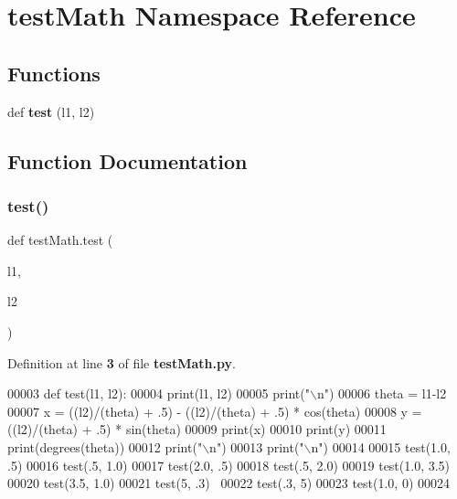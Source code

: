 \section{test\+Math Namespace Reference}
\label{namespacetest_math}
\subsection*{Functions}
\begin{DoxyCompactItemize}
\item 
def \textbf{ test} (l1, l2)
\end{DoxyCompactItemize}


\subsection{Function Documentation}
\mbox{\label{namespacetest_math_accae4d78fc0739220d35c06c2c0d5822}} 
\subsubsection{test()}
{\footnotesize\ttfamily def test\+Math.\+test (\begin{DoxyParamCaption}\item[{}]{l1,  }\item[{}]{l2 }\end{DoxyParamCaption})}



Definition at line \textbf{ 3} of file \textbf{ test\+Math.\+py}.


\begin{DoxyCode}
00003 \textcolor{keyword}{def }test(l1, l2):
00004     print(l1, l2)
00005     print(\textcolor{stringliteral}{"\(\backslash\)n"})
00006     theta = l1-l2
00007     x = ((l2)/(theta) + .5) - ((l2)/(theta) + .5) * cos(theta)
00008     y = ((l2)/(theta) + .5) * sin(theta)
00009     print(x)
00010     print(y)
00011     print(degrees(theta))
00012     print(\textcolor{stringliteral}{"\(\backslash\)n"})
00013     print(\textcolor{stringliteral}{"\(\backslash\)n"})
00014 
00015 test(1.0, .5)
00016 test(.5, 1.0)
00017 test(2.0, .5)
00018 test(.5, 2.0)
00019 test(1.0, 3.5)
00020 test(3.5, 1.0)
00021 test(5, .3) 
00022 test(.3, 5)
00023 test(1.0, 0)
00024 \end{DoxyCode}
